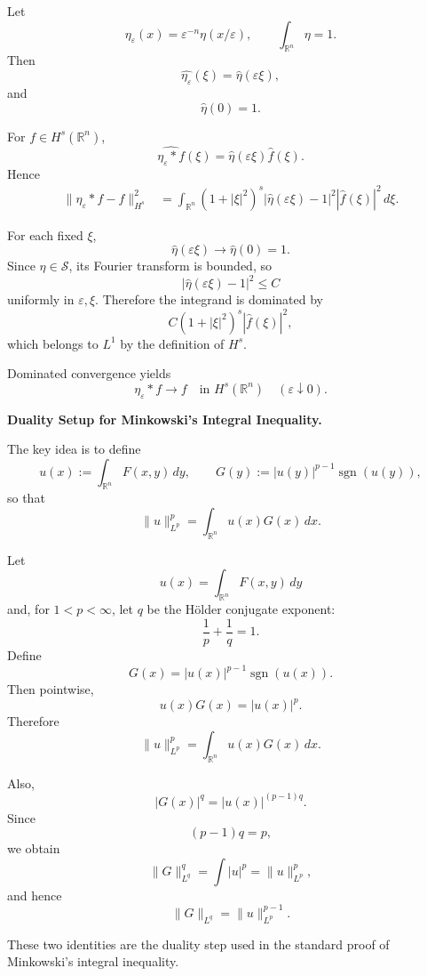 \begin{solution}
Let
\[
\eta_\varepsilon(x)
=
\varepsilon^{-n}\eta(x/\varepsilon),
\qquad
\int_{\mathbb R^n}\eta=1.
\]
Then
\[
\widehat{\eta_\varepsilon}(\xi)
=
\widehat\eta(\varepsilon\xi),
\]
and
\[
\widehat\eta(0)=1.
\]

For \(f\in H^s(\mathbb R^n)\),
\[
\widehat{\eta_\varepsilon*f}(\xi)
=
\widehat\eta(\varepsilon\xi)\widehat f(\xi).
\]
Hence
\[
\begin{aligned}
\|\eta_\varepsilon*f-f\|_{H^s}^2
&=
\int_{\mathbb R^n}
(1+|\xi|^2)^s
|\widehat\eta(\varepsilon\xi)-1|^2
|\widehat f(\xi)|^2\,d\xi.
\end{aligned}
\]

For each fixed \(\xi\),
\[
\widehat\eta(\varepsilon\xi)\to\widehat\eta(0)=1.
\]
Since \(\eta\in\mathcal S\), its Fourier transform is bounded, so
\[
|\widehat\eta(\varepsilon\xi)-1|^2
\le C
\]
uniformly in \(\varepsilon,\xi\). Therefore the integrand is dominated by
\[
C(1+|\xi|^2)^s|\widehat f(\xi)|^2,
\]
which belongs to \(L^1\) by the definition of \(H^s\).

Dominated convergence yields
\[
\boxed{
\eta_\varepsilon*f\to f
\quad\text{in }H^s(\mathbb R^n)
\quad(\varepsilon\downarrow0).
}
\]
\end{solution}


\begin{problem}[CP-II-0236]
\label{prob:cp-ii-0236}
\textbf{Duality Setup for Minkowski's Integral Inequality.}

\hspace*{1.5em}The key idea is to define
	\[
	u(x) := \int_{\mathbb{R}^n} F(x,y)\,dy,
	\qquad
	G(y) := |u(y)|^{p-1}\operatorname{sgn}(u(y)),
	\]
	so that
	\[
	\|u\|_{L^p}^p = \int_{\mathbb{R}^n} u(x) G(x)\,dx.
	\]
\end{problem}

\begin{solution}
Let
\[
u(x)
=
\int_{\mathbb R^n}F(x,y)\,dy
\]
and, for \(1<p<\infty\), let \(q\) be the Hölder conjugate exponent:
\[
\frac1p+\frac1q=1.
\]
Define
\[
G(x)
=
|u(x)|^{p-1}\operatorname{sgn}(u(x)).
\]
Then pointwise,
\[
u(x)G(x)=|u(x)|^p.
\]
Therefore
\[
\boxed{
\|u\|_{L^p}^p
=
\int_{\mathbb R^n}u(x)G(x)\,dx.
}
\]

Also,
\[
|G(x)|^q
=
|u(x)|^{(p-1)q}.
\]
Since
\[
(p-1)q=p,
\]
we obtain
\[
\|G\|_{L^q}^q
=
\int|u|^p
=
\|u\|_{L^p}^p,
\]
and hence
\[
\boxed{
\|G\|_{L^q}
=
\|u\|_{L^p}^{p-1}.
}
\]

These two identities are the duality step used in the standard proof of Minkowski's integral
inequality.
\end{solution}


